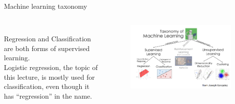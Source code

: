 \documentclass[aspectratio=169]{../latex_main/tntbeamer}  %
\begin{document}
	
	\begin{frame}[c]{Machine learning taxonomy}
	    \begin{columns}
	        \begin{column}{.5\textwidth}
	        \\\bigskip\bigskip\bigskip
	                Regression and Classification are both forms of supervised learning. \\
	                \bigskip
	                Logistic regression, the topic of this lecture, is mostly used for classification, even though it has “regression” in the name. 
	        \end{column}
	        
	        
	        \begin{column}{.5\textwidth}
	                \begin{figure}
	                    \centering
	                    \includegraphics[scale=.3]{Bild2}
	                \end{figure}
	        \end{column}
	    \end{columns}
	\end{frame}
\end{document}

